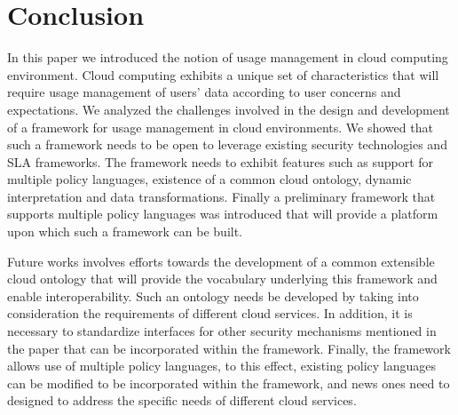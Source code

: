 \documentclass[times, 10pt,twocolumn]{article}
\begin{document}



\section{Conclusion}
In this paper we introduced the notion of usage management in cloud computing environment. Cloud computing exhibits a unique set of characteristics that will require usage management of users' data according to user concerns and expectations. We analyzed the challenges involved in the design and development of a framework for usage management in cloud environments. We showed that such a framework needs to be open to leverage existing security technologies and SLA frameworks. The framework needs to exhibit features such as support for multiple policy languages, existence of a common cloud ontology, dynamic interpretation and data transformations. Finally a preliminary framework that supports multiple policy languages was introduced that will provide a platform upon which such a framework can be built. 

Future works involves efforts towards the development of a common extensible cloud ontology that will provide the vocabulary underlying this framework and enable interoperability. Such an ontology needs be developed by taking into consideration the requirements of different cloud services. In addition, it is necessary to standardize interfaces for other security mechanisms mentioned in the paper that can be incorporated within the framework. Finally, the framework allows use of multiple policy languages, to this effect, existing policy languages can be modified to be incorporated within the framework, and news ones need to designed to address the specific needs of different cloud services.



\end{document}
